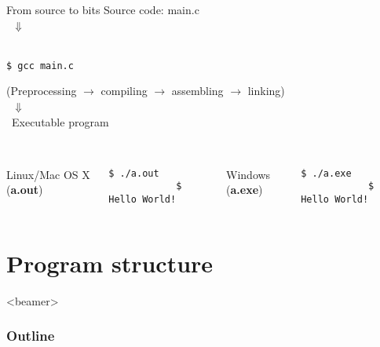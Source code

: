 \begin{frame}[fragile]{From source to bits}
	\centering
	Source code: main.c\\\
	$\Downarrow$\\\
	\begin{lstlisting}[numbers=none]
		$ gcc main.c
	\end{lstlisting}
\vspace{-0.2in}
(Preprocessing $\rightarrow$ compiling $\rightarrow$ assembling $\rightarrow$ linking)
	\ \\\
	$\Downarrow$\\\ 
	Executable program\\\
	\begin{columns}[T]
		\column{.35\textwidth}
		Linux/Mac OS X (\textbf{a.out})
		\begin{lstlisting}[numbers=none]
			$ ./a.out
			$ Hello World!
		\end{lstlisting}
		\column{.3\textwidth}
		Windows (\textbf{a.exe})
		\begin{lstlisting}[numbers=none]
			$ ./a.exe
			$ Hello World!
		\end{lstlisting}
	\end{columns}
\end{frame}

\section{Program structure}
\label{sec:strt}
\begin{frame}<beamer>
    \frametitle{Outline}
    \tableofcontents[currentsection]
\end{frame}



